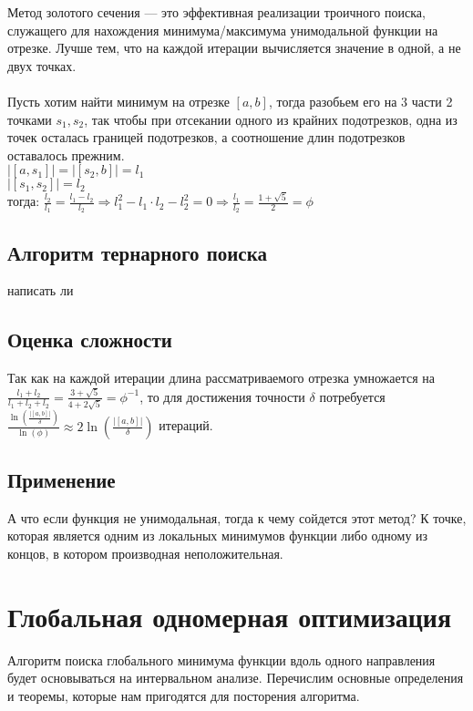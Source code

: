 \documentclass{article}
\begin{document}
    Метод золотого сечения — это эффективная реализации троичного поиска, служащего для нахождения минимума/максимума унимодальной функции на отрезке. Лучше тем, что на каждой итерации вычисляется значение в одной, а не двух точках.\\\\
    Пусть хотим найти минимум на отрезке $[a, b]$, тогда разобьем его на 3 части 2 точками $s_1, s_2$, так чтобы при отсекании одного из крайних подотрезков, одна из точек осталась границей подотрезков, а соотношение длин подотрезков оставалось прежним.\\
    $|[a, s_1]|=|[s_2, b]|=l_1$\\
    $|[s_1, s_2]|=l_2$\\
    тогда: $\frac{l_2}{l_1}=\frac{l_1-l_2}{l_2} \Rightarrow l_1^2-l_1\cdot{l_2}-l_2^2=0 \Rightarrow \frac{l_1}{l_2}=\frac{1+\sqrt{5}}{2}=\phi$

    \subsection{Алгоритм тернарного поиска}
    написать ли

    \subsection{Оценка сложности}
    Так как на каждой итерации длина рассматриваемого отрезка умножается на $\frac{l_1+l_2}{l_1+l_2+l_2}=\frac{3+\sqrt{5}}{4+2\sqrt{5}}=\phi^{-1}$, то для достижения точности $\delta$ потребуется $\frac{\ln(\frac{|[a, b]|}{\delta})}{\ln(\phi)} \approx 2\ln(\frac{|[a, b]|}{\delta})$ итераций.

    \subsection{Применение}
    А что если функция не унимодальная, тогда к чему сойдется этот метод? К точке, которая является одним из локальных минимумов функции либо одному из концов, в котором производная неположительная.\\









    \newpage


    \section{Глобальная одномерная оптимизация}
    Алгоритм поиска глобального минимума функции вдоль одного направления будет основываться на интервальном анализе. Перечислим основные определения и теоремы, которые нам пригодятся для посторения алгоритма.
\end{document}
